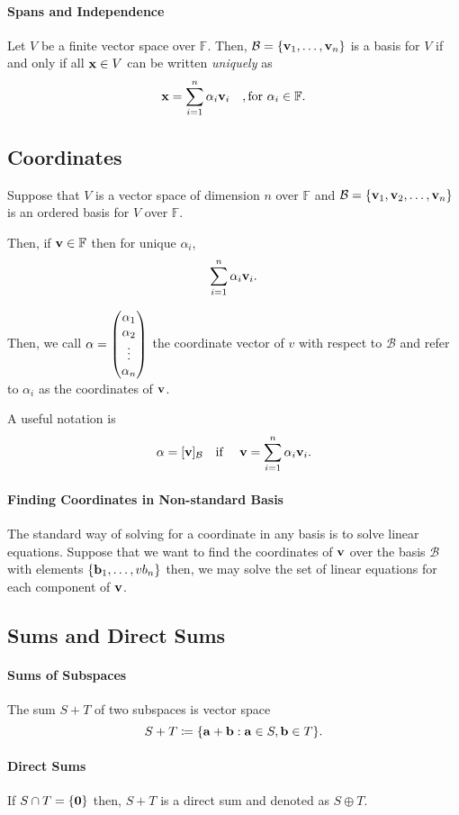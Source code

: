 \paragraph{Spans and Independence}
Let \(V\) be a finite vector space over \(\mathbb{F}\).
Then, \(\mathcal{B} = \{\mathbf{v}_1, \dots, \mathbf{v}_n\}\) is a basis for
\(V\) if and only if all \(\mathbf{x} \in V\)
can be written \textit{uniquely} as 
\[
    \mathbf{x} = \sum_{i=1}^{n} \alpha_i \mathbf{v}_i \quad, \text{for } \alpha_i \in \mathbb{F}.
\]

\subsection{Coordinates}
Suppose that \(V\) is a vector space of dimension \(n\) over \(\mathbb{F}\)
and \(\mathcal{B} = \{\mathbf{v}_1, \mathbf{v}_2,\dots, \mathbf{v}_n\}\) is an ordered
basis for \(V\) over \(\mathbb{F}\).

Then, if \(\mathbf{v}\in \mathbb{F}\) then for unique \(\alpha_i\),
\[
    \sum_{i=1}^{n} \alpha_i \mathbf{v}_i.
\]

Then, we call \(\mathbf{\alpha}
    = \begin{pmatrix}
        \alpha_1 \\ \alpha_2 \\ \vdots \\ \alpha_n
    \end{pmatrix}
\) the coordinate vector of \(v\) with respect to \(\mathcal{B}\)
and refer to \(\alpha_i\) as the coordinates of \(\mathbf{v}\).

A useful notation is
\[
    \mathbf{\alpha} = [\mathbf{v}]_\mathcal{B}
    \text{\quad if \quad}
    \mathbf{v} = \sum_{i=1}^{n} \alpha_i \mathbf{v}_i.
\]

\paragraph{Finding Coordinates in Non-standard Basis}
The standard way of solving for a coordinate in any basis is to solve
linear equations.
Suppose that we want to find the coordinates of \(\mathbf{v}\) over the
basis \(\mathcal{B}\) with elements \(\{\mathbf{b}_1, \dots, vb_n\}\)
then, we may solve the set of linear equations for each component of
\(\mathbf{v}\).

\subsection{Sums and Direct Sums}

\paragraph{Sums of Subspaces}
The sum \(S + T\) of two subspaces is vector space
\[
    S + T \coloneqq \{
        \mathbf{a} + \mathbf{b} : \mathbf{a} \in S, \mathbf{b} \in T
    \}.
\]
\paragraph{Direct Sums}
If \(S\cap T = \{\mathbf{0}\}\) then, \(S + T\) is a direct sum and denoted
as \(S \oplus T\).



